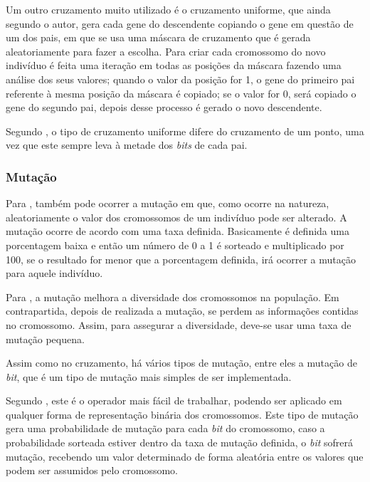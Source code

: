 \par Um outro cruzamento muito utilizado é o cruzamento uniforme, que
ainda segundo o autor, gera cada gene do descendente copiando o gene em questão
de um dos pais, em que se usa uma máscara de cruzamento que é gerada aleatoriamente para fazer a escolha.
Para criar cada cromossomo do novo indivíduo é feita uma iteração em todas as
posições da máscara fazendo uma análise dos seus valores; quando o valor da posição for 1, o gene do
primeiro pai referente à mesma posição da máscara é copiado; se o valor for 0,
será copiado o gene do segundo pai, depois desse processo é gerado o novo descendente.

\par Segundo , o tipo de cruzamento
uniforme difere do cruzamento de um ponto, uma vez que este sempre leva à
metade dos \textit{bits} de cada pai.

\subsubsection{Mutação}

\par Para , também pode ocorrer a mutação em
que, como ocorre na natureza, aleatoriamente o valor dos
cromossomos de um indivíduo pode ser alterado. A mutação ocorre de acordo com
uma taxa definida. Basicamente é definida uma porcentagem baixa e então um
número de 0 a 1 é sorteado e multiplicado por 100, se o resultado for menor que
a porcentagem definida, irá ocorrer a mutação para aquele indivíduo.

\par Para , a mutação melhora a
diversidade dos cromossomos na população. Em contrapartida, depois de realizada
a mutação, se perdem as informações contidas no cromossomo. Assim, para assegurar
a diversidade, deve-se usar uma taxa de mutação pequena. 


\par Assim como no cruzamento, há vários tipos de mutação, entre eles a mutação
de \textit{bit}, que é um tipo de mutação mais simples de ser implementada.

\par Segundo , este é o operador
mais fácil de trabalhar, podendo ser aplicado em qualquer forma de representação
binária dos cromossomos. Este tipo de mutação gera uma probabilidade de mutação
para cada \textit{bit} do cromossomo, caso a probabilidade sorteada estiver
dentro da taxa de mutação definida, o \textit{bit} sofrerá mutação, recebendo um
valor determinado de forma aleatória entre os valores que podem ser assumidos pelo cromossomo.


